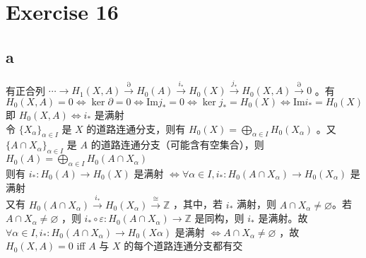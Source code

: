 \documentclass[12pt]{article}
\begin{document}
\section{Exercise 16}
\subsection{a}
有正合列 $\cdots\to H_{1}(X,A)\stackrel{\partial}{\to} H_0(A)\stackrel{i_*}{\to} H_0(X)\stackrel{j_*}{\to}H_0(X,A)\stackrel{\partial}{\to} 0$ 。有 $H_0(X,A)=0\Leftrightarrow \ker \partial = 0 \Leftrightarrow \textrm{Im} j_*=0\Leftrightarrow \ker j_*=H_0(X)\Leftrightarrow \textrm{Im} i_*=H_0(X)$
即 $H_0(X,A)\Leftrightarrow i_*$ 是满射\\
令 $\{X_\alpha\}_{\alpha\in I}$ 是 $X$ 的道路连通分支，则有 $H_0(X)=\bigoplus_{\alpha\in I}H_0(X_\alpha)$ 。又 $\{A\cap X_\alpha\}_{\alpha\in I}$ 是 $A$ 的道路连通分支（可能含有空集合），则 $H_0(A)=\bigoplus_{\alpha\in I}H_0(A\cap X_\alpha)$ \\
则有 $i_*:H_0(A)\to H_0(X)$ 是满射 $\Leftrightarrow \forall \alpha\in I,i_*:H_0(A\cap X_\alpha)\to H_0(X_\alpha)$ 是满射\\
又有 $H_0(A\cap X_\alpha)\stackrel{i_*}{\to} H_0(X_\alpha)\stackrel{\cong}{\to} \mathbb{Z}$ ，其中，若 $i_*$ 满射，则 $A\cap X_\alpha\neq \varnothing$。若 $A\cap X_\alpha \neq \varnothing$ ，则 $i_*\circ \varepsilon: H_0(A\cap X_\alpha)\to \mathbb{Z}$ 是同构，则 $i_*$ 是满射。故 $\forall \alpha \in I ,i_*:H_0(A\cap X_\alpha)\to H_0(X\alpha)$ 是满射 $\Leftrightarrow A\cap X_\alpha \neq \varnothing$ ，故 $H_0(X,A)=0$ iff $A$ 与 $X$ 的每个道路连通分支都有交
\end{document}
